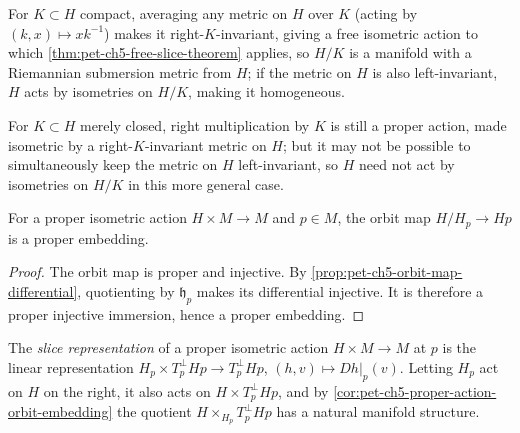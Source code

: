 \begin{remark}
  \label{rem:pet-ch5-quotient-homogeneous}

  For $K\subset H$ compact, averaging any metric on $H$ over $K$ (acting by
  $(k,x)\mapsto xk^{-1}$) makes it right-$K$-invariant, giving a free isometric
  action to which \cref{thm:pet-ch5-free-slice-theorem} applies, so $H/K$ is a
  manifold with a Riemannian submersion metric from $H$; if the metric on $H$ is
  also left-invariant, $H$ acts by isometries on $H/K$, making it homogeneous.
\end{remark}

\begin{remark}
  \label{rem:pet-ch5-closed-subgroup-quotient}

  For $K\subset H$ merely closed, right multiplication by $K$ is still a proper
  action, made isometric by a right-$K$-invariant metric on $H$; but it may not be
  possible to simultaneously keep the metric on $H$ left-invariant, so $H$ need not
  act by isometries on $H/K$ in this more general case.
\end{remark}

\begin{corollary}
  \label{cor:pet-ch5-proper-action-orbit-embedding}

  For a proper isometric action $H\times M\to M$ and $p\in M$, the orbit map
  $H/H_p\to Hp$ is a proper embedding.
\end{corollary}
\begin{proof}
  \sketch
  The orbit map is proper and injective.  By
  \cref{prop:pet-ch5-orbit-map-differential}, quotienting by $\mathfrak h_p$ makes
  its differential injective.  It is therefore a proper injective immersion, hence
  a proper embedding.
\end{proof}

\begin{definition}
  \label{def:pet-ch5-slice-representation}

  The \emph{slice representation} of a proper isometric action $H\times M\to M$ at
  $p$ is the linear representation $H_p\times T_p^\perp Hp\to T_p^\perp Hp$,
  $(h,v)\mapsto Dh|_p(v)$. Letting $H_p$ act on $H$ on the right, it also acts on
  $H\times T_p^\perp Hp$, and by \cref{cor:pet-ch5-proper-action-orbit-embedding}
  the quotient $H\times_{H_p}T_p^\perp Hp$ has a natural manifold structure.
\end{definition}


